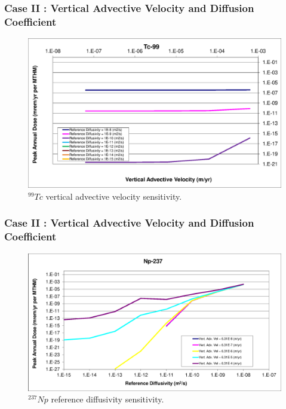 \begin{frame}[c]
\begin{frame}[c]
  \frametitle{Case II : Vertical Advective Velocity and Diffusion Coefficient}
\begin{figure}[ht!]
\centering
\includegraphics[width=\linewidth]{AdvVelAndDiffCoeffEBSFail/Tc-99-VAdvVel.eps}
\caption{$^{99}Tc$ vertical advective velocity sensitivity.}
\label{fig:VAdvVelTc99VAdvVel}
\end{figure}
\end{frame}


\begin{frame}[c]
  \frametitle{Case II : Vertical Advective Velocity and Diffusion Coefficient}
\begin{figure}[htp!]
\centering
\includegraphics[width=\linewidth]{AdvVelAndDiffCoeffEBSFail/Np-237.eps}
\caption{$^{237}Np$ reference diffusivity sensitivity.}
\label{fig:VAdvVelNp237}
\end{figure}
\end{frame}


\end{frame}
